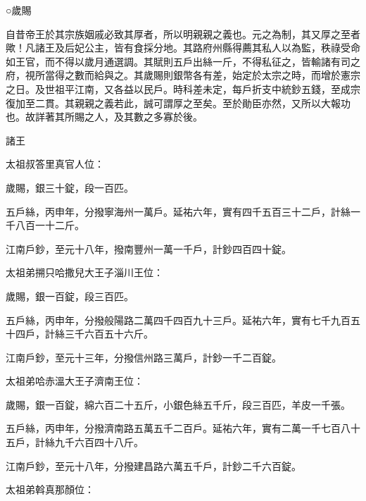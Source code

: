 
\begin{pinyinscope}

 ○歲賜



 自昔帝王於其宗族姻戚必致其厚者，所以明親親之義也。元之為制，其又厚之至者歟！凡諸王及后妃公主，皆有食採分地。其路府州縣得薦其私人以為監，秩祿受命如王官，而不得以歲月通選調。其賦則五戶出絲一斤，不得私征之，皆輸諸有司之府，視所當得之數而給與之。其歲賜則銀幣各有差，始定於太宗之時，而增於憲宗之日。及世祖平江南，又各益以民戶。時科差未定，每戶折支中統鈔五錢，至成宗復加至二貫。其親親之義若此，誠可謂厚之至矣。至於勛臣亦然，又所以大報功也。故詳著其所賜之人，及其數之多寡於後。



 諸王



 太祖叔答里真官人位：



 歲賜，銀三十錠，段一百匹。



 五戶絲，丙申年，分撥寧海州一萬戶。延祐六年，實有四千五百三十二戶，計絲一千八百一十二斤。



 江南戶鈔，至元十八年，撥南豐州一萬一千戶，計鈔四百四十錠。



 太祖弟搠只哈撒兒大王子淄川王位：



 歲賜，銀一百錠，段三百匹。



 五戶絲，丙申年，分撥般陽路二萬四千四百九十三戶。延祐六年，實有七千九百五十四戶，計絲三千六百五十六斤。



 江南戶鈔，至元十三年，分撥信州路三萬戶，計鈔一千二百錠。



 太祖弟哈赤溫大王子濟南王位：



 歲賜，銀一百錠，綿六百二十五斤，小銀色絲五千斤，段三百匹，羊皮一千張。



 五戶絲，丙申年，分撥濟南路五萬五千二百戶。延祐六年，實有二萬一千七百八十五戶，計絲九千六百四十八斤。



 江南戶鈔，至元十八年，分撥建昌路六萬五千戶，計鈔二千六百錠。



 太祖弟斡真那顏位：




\end{pinyinscope}
